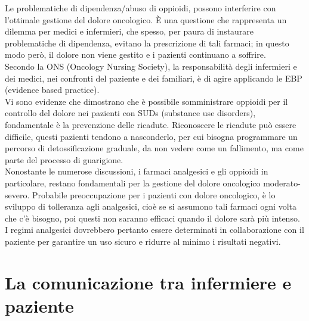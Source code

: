 Le problematiche di dipendenza/abuso di oppioidi, possono interferire con l’ottimale gestione del dolore oncologico. 
È una questione che rappresenta un dilemma per medici e infermieri, che spesso, per paura di instaurare problematiche di 
dipendenza, evitano la prescrizione di tali farmaci; in questo modo però, il dolore non viene gestito e 
i pazienti continuano a soffrire\cite{PAINONS}.\\ 
Secondo la ONS (Oncology Nursing Society), la responsabilità degli infermieri e dei medici, nei confronti 
del paziente e dei familiari, è di agire applicando le EBP (evidence based practice)\cite{PAINONS}.\\
Vi sono evidenze che dimostrano che è possibile somministrare oppioidi per il controllo del dolore nei pazienti con SUDs 
(substance use disorders), fondamentale è la prevenzione delle ricadute\cite{CANCERPAINONS}. 
Riconoscere le ricadute può essere difficile, 
questi pazienti tendono a nasconderlo, per cui bisogna programmare un percorso di detossificazione graduale, 
da non vedere come un fallimento, ma come parte del processo di guarigione\cite{CANCERPAINONS}.\\
Nonostante le numerose discussioni, i farmaci analgesici e gli oppioidi in particolare, restano fondamentali per 
la gestione del dolore oncologico moderato-severo. Probabile preoccupazione per i pazienti con dolore oncologico, 
è lo sviluppo di tolleranza agli analgesici, cioè se si assumono tali farmaci ogni volta che c’è bisogno, poi questi 
non saranno efficaci quando il dolore sarà più intenso. I regimi analgesici dovrebbero pertanto essere 
determinati in collaborazione con il paziente per garantire un uso sicuro e ridurre al minimo i risultati negativi\cite{analgesici}. 

\section{La comunicazione tra infermiere e paziente}

